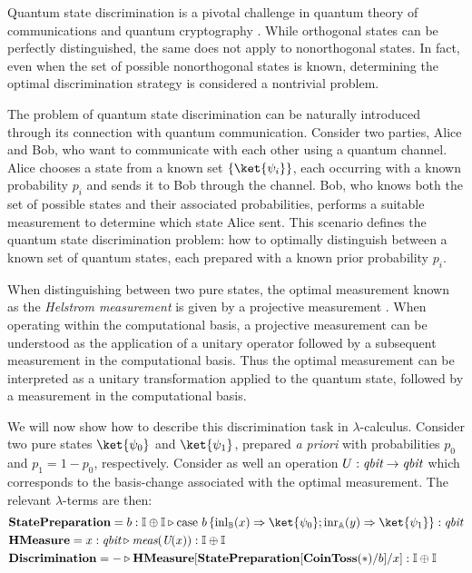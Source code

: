 \begin{example} \label{ex:quantum_state_discrimination_syntax}

Quantum state discrimination is a pivotal challenge in 
 quantum theory of communications \cite{barnett2009qinfo,watrous2018theory} and  quantum cryptography \cite{Gisin02qcripto}. 
While orthogonal states can be perfectly distinguished, the same does not apply
to nonorthogonal states. In fact, even when the set of possible nonorthogonal
states is known, determining the optimal discrimination strategy is considered
a nontrivial problem.

The problem of quantum state discrimination can be naturally introduced through its connection with quantum communication. Consider two parties, Alice and Bob, who want to communicate with each other using a quantum channel. Alice chooses a state from a known set $\{\ket{\psi_i}\}$, each occurring with a known probability $p_i$ and sends it to Bob through the channel. Bob, who knows both the set of possible states and their associated probabilities, performs a suitable measurement to determine which state Alice sent. This scenario defines the quantum state discrimination problem: how to optimally distinguish between a known set of quantum states, each prepared with a known prior probability $p_i$.

When distinguishing between two pure states, the optimal measurement known as the \emph{Helstrom measurement} is given by a projective measurement
\cite{barnett2009qinfo}.  When operating within the computational basis, a
projective measurement can be understood as the application of a unitary
operator followed by a subsequent measurement in the computational basis. Thus
the optimal measurement can be interpreted as a unitary transformation applied
to the quantum state, followed by a measurement in the computational basis. 

We will now show how to describe this discrimination task in
$\lambda$-calculus.  Consider two pure states $\ket{\psi_0}$ and
$\ket{\psi_1}$, prepared \emph{a priori} with probabilities $p_0$ and $p_1 = 1-p_0$,
respectively. Consider as well an operation $U : \emph{qbit} \to \emph{qbit}$ which
corresponds to the basis-change associated with the optimal measurement.
The relevant $\lambda$-terms are then:
\begin{align*}
  &\textbf{StatePreparation} =  b: \typeI \oplus \typeI  \vljud  \text{case } b\,
  \{\inl_{\typeB}(x) \Rightarrow \ket{\psi_0} ; \inr_{\typeA}(y) \Rightarrow \ket{\psi_1}\}: \textit{qbit} \\
  &\textbf{HMeasure} =  x : \emph{qbit} \vljud \emph{meas} (\emph{U}(x)): \typeI \oplus \typeI \\
  &\textbf{Discrimination} = - \vljud \textbf{HMeasure} [ \textbf{StatePreparation} [\textbf{CoinToss}(*)/ b] / x] : \typeI\oplus \typeI
\end{align*}


\end{example}
